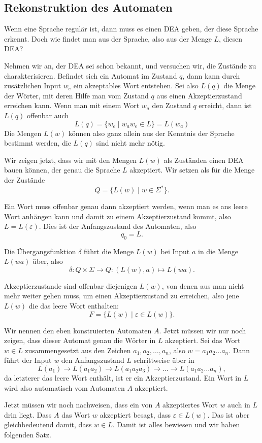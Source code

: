 \subsection{Rekonstruktion des Automaten\label{regulaer:rekonstruktion}}
Wenn eine Sprache regulär ist, dann muss es einen DEA geben, der
diese Sprache erkennt.
Doch wie findet man aus der Sprache, also aus der Menge $L$, diesen DEA?

Nehmen wir an, der DEA sei schon bekannt, und versuchen wir,
die Zustände zu charakterisieren.
Befindet sich ein Automat im Zustand $q$, dann kann durch zusätzlichen
Input $w_e$ ein akzeptables Wort entstehen.
Sei also $L(q)$ die Menge der Wörter, mit deren Hilfe man vom Zustand $q$
aus einen Akzeptierzustand erreichen kann.
Wenn man mit einem Wort $w_a$ den Zustand $q$ erreicht, dann ist $L(q)$
offenbar auch
\[
L(q)=\{ w_e\;|\; w_aw_e \in L\}= L(w_a)
\]
Die Mengen $L(w)$ können also ganz allein aus der Kenntnis der
Sprache bestimmt werden, die $L(q)$ sind nicht mehr nötig.

Wir zeigen jetzt, dass wir mit den Mengen $L(w)$ als Zuständen einen
DEA bauen können, der genau die Sprache $L$ akzeptiert.
Wir setzen als für die Menge der Zustände 
\[
Q=\{L(w)\;|\;w\in\Sigma^*\}.
\]

Ein Wort muss offenbar genau dann akzeptiert werden, wenn
man es ans leere Wort anhängen kann und damit zu einem Akzeptierzustand
kommt, also $L=L(\varepsilon)$.
Dies ist der Anfangszustand des Automaten, also
\[
q_0=L.
\]

Die Übergangsfunktion $\delta$ führt die Menge $L(w)$ bei Input
$a$ in die Menge $L(wa)$ über, also
\[
\delta \colon Q\times\Sigma\to Q:(L(w),a)\mapsto L(wa).
\]

Akzeptierzustande sind offenbar diejenigen $L(w)$, von denen
aus man nicht mehr weiter gehen muss, um einen Akzeptierzustand
zu erreichen, also jene $L(w)$ die das leere Wort enthalten:
\[
F=\{L(w)\;|\;\varepsilon\in L(w)\}.
\]

Wir nennen den eben konstruierten Automaten $A$.
Jetzt müssen wir nur noch zeigen, dass dieser Automat genau die
Wörter in $L$ akzeptiert.
Sei das Wort $w\in L$ zusammengesetzt aus den
Zeichen $a_1,a_2,\dots,a_n$, also $w=a_1a_2\dots a_n$.
Dann führt der Input $w$ den Anfangszustand $L$ schrittweise über in
\[
L(a_1)\to L(a_1a_2)\to L(a_1a_2a_3)\to \dots \to L(a_1a_2\dots a_n),
\]
da letzterer das leere Wort enthält, ist er ein Akzeptierzustand.
Ein Wort in $L$ wird also automatisch vom Automaten $A$ akzeptiert.

Jetzt müssen wir noch nachweisen, dass ein von $A$ akzeptiertes Wort $w$
auch in $L$ drin liegt.
Dass $A$ das Wort $w$ akzeptiert besagt, dass $\varepsilon \in L(w)$.
Das ist aber gleichbedeutend damit, dass $w\in L$.
Damit ist alles bewiesen und wir haben folgenden Satz.

